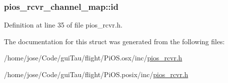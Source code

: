 \hypertarget{structpios__rcvr__channel__map_afab196794b5bf1f8bfdc1b65a97988e4}{
\subsubsection[{id}]{ pios\-\_\-rcvr\-\_\-channel\-\_\-map\-::id}}\label{structpios__rcvr__channel__map_afab196794b5bf1f8bfdc1b65a97988e4}


Definition at line 35 of file pios\-\_\-rcvr.\-h.



The documentation for this struct was generated from the following files\-:\begin{DoxyCompactItemize}
\item 
/home/jose/\-Code/gui\-Tau/flight/\-Pi\-O\-S.\-osx/inc/\hyperlink{osx_2inc_2pios__rcvr_8h}{pios\-\_\-rcvr.\-h}\item 
/home/jose/\-Code/gui\-Tau/flight/\-Pi\-O\-S.\-posix/inc/\hyperlink{posix_2inc_2pios__rcvr_8h}{pios\-\_\-rcvr.\-h}\end{DoxyCompactItemize}
